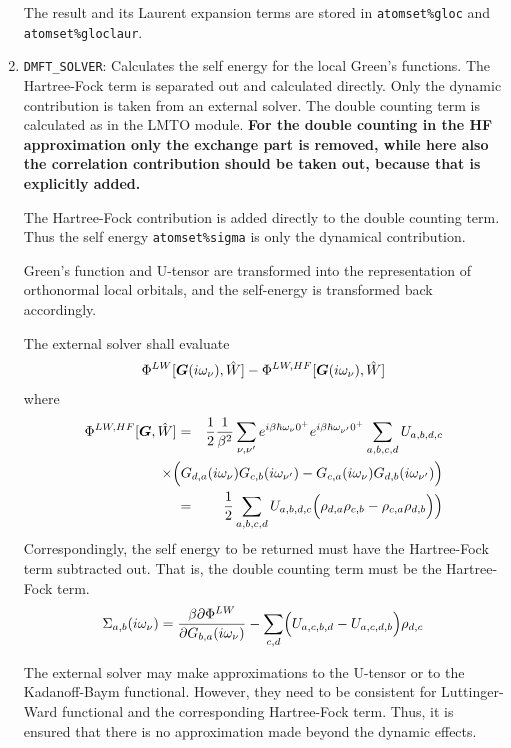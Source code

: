 \documentclass[11pt,a4paper]{report}
\begin{document}
\begin{enumerate}
The result and its Laurent expansion terms are stored in
\verb|atomset%gloc| and \verb|atomset%gloclaur|.
%
\item \verb|DMFT_SOLVER|: Calculates the self energy for the local
  Green's functions. The Hartree-Fock term is separated out and
  calculated directly. Only the dynamic contribution is taken from an
  external solver. The double counting term is calculated as in the
  LMTO module. \textbf{For the double counting in the HF approximation
    only the exchange part is removed, while here also the correlation
    contribution should be taken out, because that is explicitly
    added.}

  The Hartree-Fock contribution is added directly to the double
  counting term. Thus the self energy \verb|atomset%sigma| is only
  the dynamical contribution.

Green's function and U-tensor are transformed into the representation
of orthonormal local orbitals, and the self-energy is transformed back
accordingly.

The external solver shall evaluate
\begin{eqnarray}
\Phi^{LW}[\bm{G}(i\omega_\nu),\hat{W}]
-\Phi^{LW,HF}[\bm{G}(i\omega_\nu),\hat{W}]
\end{eqnarray}
where
\begin{eqnarray}
  \Phi^{LW,HF}[\mat{G},\hat{W}]
  &=&
  \frac{1}{2}
  \frac{1}{\beta^{2}} 
  \sum_{\nu,\nu'} e^{i \beta \hbar \omega_\nu 0^{+}} e^{i \beta \hbar \omega_{\nu'} 0^{+}}
  \sum_{a,b,c,d}
  U_{a,b,d,c} 
  \nonumber\\ 
  &&\hspace{-1.2cm}\times\Big(
  G_{d,a}(i\omega_\nu)G_{c,b}(i\omega_{\nu'})
  -  G_{c,a}(i\omega_\nu)G_{d,b}(i\omega_{\nu'})
  \Big) 
\nonumber\\
&=& \frac{1}{2}
  \sum_{a,b,c,d}
  U_{a,b,d,c} \Bigl(
  \rho_{d,a}\rho_{c,b} -  \rho_{c,a}\rho_{d,b}\Bigr)
  \Big) 
\end{eqnarray}
Correspondingly, the self energy to be returned must have the
Hartree-Fock term subtracted out. That is, the double counting term
must be the Hartree-Fock term.
\begin{eqnarray*}
\Sigma_{a,b}(i\omega_\nu)=\frac{\beta\partial\Phi^{LW}}
{\partial G_{b,a}(i\omega_\nu)}-\sum_{c,d}\Bigl(U_{a,c,b,d}-U_{a,c,d,b}\Bigr)
\rho_{d,c}
\end{eqnarray*}

The external solver may make approximations to the U-tensor or to the
Kadanoff-Baym functional. However, they need to be consistent for
Luttinger-Ward functional and the corresponding Hartree-Fock
term. Thus, it is ensured that there is no approximation made beyond
the dynamic effects.


\end{enumerate}
\end{document}
